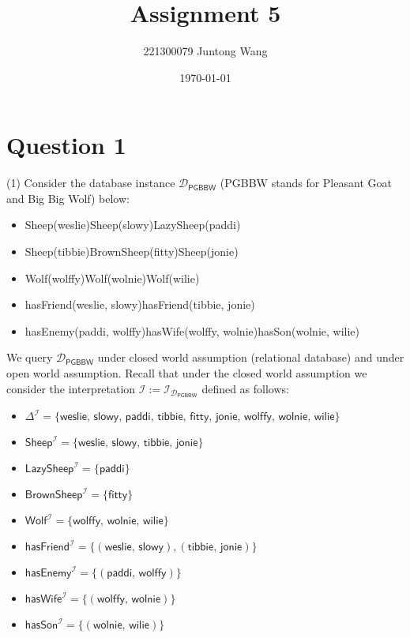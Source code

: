 \documentclass{article}
\title{Assignment 5}
\author{221300079 Juntong Wang}
\date{\today}
\begin{document}
	\maketitle

	\section{Question 1}
    (1) Consider the database instance $\mathcal{D}_{\textsf{PGBBW}}$ (\textsf{PGBBW} stands for \textsf{Pleasant Goat and Big Big Wolf}) below:
    
    \begin{itemize}
        \item[] \textsf{Sheep(weslie)}\quad\textsf{Sheep(slowy)}\quad\textsf{LazySheep(paddi)}
        \item[] \textsf{Sheep(tibbie)}\quad\textsf{BrownSheep(fitty)}\quad\textsf{Sheep(jonie)}
        \item[] \textsf{Wolf(wolffy)}\quad\textsf{Wolf(wolnie)}\quad\textsf{Wolf(wilie)}
        \item[] \textsf{hasFriend(weslie, slowy)}\quad\textsf{hasFriend(tibbie, jonie)}
        \item[] \textsf{hasEnemy(paddi, wolffy)}\quad\textsf{hasWife(wolffy, wolnie)}\quad\textsf{hasSon(wolnie, wilie)}
    \end{itemize}
    
    
    \noindent We query $\mathcal{D}_{\textsf{PGBBW}}$ under closed world assumption (relational database) and under open world assumption. Recall that under the closed world assumption we consider the interpretation $\mathcal{I}:=\mathcal{I}_{\mathcal{D}_{\textsf{PGBBW}}}$ defined as follows:
    
    \begin{itemize}
        \item[] $\Delta^{\mathcal{I}}=\{\textsf{weslie, slowy, paddi, tibbie, fitty, jonie, wolffy, wolnie, wilie}\}$
        \item[] $\textsf{Sheep}^{\mathcal{I}}=\{\textsf{weslie, slowy, tibbie, jonie}\}$
        \item[] $\textsf{LazySheep}^{\mathcal{I}}=\{\textsf{paddi}\}$
        \item[] $\textsf{BrownSheep}^{\mathcal{I}}=\{\textsf{fitty}\}$
        \item[] $\textsf{Wolf}^{\mathcal{I}}=\{\textsf{wolffy, wolnie, wilie}\}$
        \item[] $\textsf{hasFriend}^{\mathcal{I}}=\{(\textsf{weslie, slowy}),(\textsf{tibbie, jonie})\}$
        \item[] $\textsf{hasEnemy}^{\mathcal{I}}=\{(\textsf{paddi, wolffy})\}$
        \item[] $\textsf{hasWife}^{\mathcal{I}}=\{(\textsf{wolffy, wolnie})\}$
        \item[] $\textsf{hasSon}^{\mathcal{I}}=\{(\textsf{wolnie, wilie})\}$
    \end{itemize}
    
\end{document}
